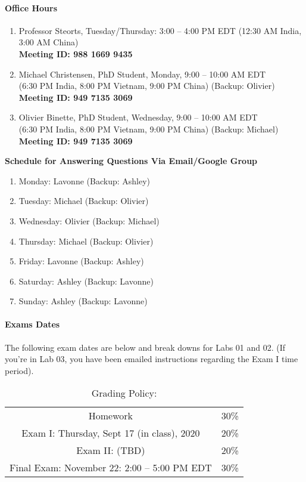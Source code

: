 \documentclass[11pt]{article}
\begin{document}
\paragraph{Office Hours}
\begin{enumerate}
\item Professor Steorts, Tuesday/Thursday: 3:00 -- 4:00 PM EDT (12:30 AM India, 3:00 AM China) \\
\textbf{Meeting ID: 988 1669 9435}
\item Michael Christensen, PhD Student, Monday, 9:00 -- 10:00 AM EDT \\(6:30 PM India, 8:00 PM Vietnam, 9:00 PM China) (Backup: Olivier)
\textbf{Meeting ID: 949 7135 3069}
\item Olivier Binette, PhD Student, Wednesday, 9:00 -- 10:00 AM EDT \\(6:30 PM India, 8:00 PM Vietnam, 9:00 PM China) (Backup: Michael)
\textbf{Meeting ID: 949 7135 3069}
\end{enumerate}


\textbf{Schedule for Answering Questions Via Email/Google Group}
\begin{enumerate}
\item Monday: Lavonne (Backup: Ashley)
\item Tuesday: Michael (Backup: Olivier)
\item Wednesday: Olivier (Backup: Michael)
\item Thursday: Michael (Backup: Olivier)
\item Friday: Lavonne (Backup: Ashley)
\item Saturday: Ashley (Backup: Lavonne)
\item Sunday: Ashley (Backup: Lavonne)
\end{enumerate}


\paragraph{Exams Dates} 
The following exam dates are below and break downs for Labs 01 and 02. (If you're in Lab 03, you have been emailed instructions regarding the Exam I time period). 

\begin{table}[h!]
\caption{Grading Policy:}
\begin{center}
\begin{tabular}{cc}
Homework &30\%\\
Exam I:  Thursday, Sept 17 (in class), 2020 &20\%\\
Exam  II: (TBD) & 20\%\\
Final Exam:  November 22: 2:00 -- 5:00 PM EDT & 30\%\\
\end{tabular}
\end{center}
\label{default}
\end{table}%
\end{document}
